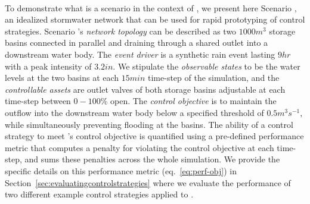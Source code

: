 \

To demonstrate what is a scenario in the context of \pystormsNOSPACE, we present here Scenario , an idealized stormwater network that can be used for rapid prototyping of control strategies. Scenario 's \emph{network topology} can be described as two $1000 \unit{m^3}$ storage basins connected in parallel and draining through a shared outlet into a downstream water body. The \emph{event driver} is a synthetic rain event lasting $9 \unit{hr}$ with a peak intensity of $3.2 \unit{in}$. We stipulate the \emph{observable states} to be the water levels at the two basins at each $15 \unit{min}$ time-step of the simulation, and the \emph{controllable assets} are outlet valves of both storage basins adjustable at each time-step between $0-100\unit{\%}$ open. The \emph{control objective} is to maintain the outflow into the downstream water body below a specified threshold of $0.5 \unit{m^3s^{-1}}$, while simultaneously preventing flooding at the basins. The ability of a control strategy to meet 's control objective is quantified using a pre-defined performance metric that computes a penalty for violating the control objective at each time-step, and sums these penalties across the whole simulation. We provide the specific details on this performance metric (eq.~\ref{eq:perf-obj}) in Section~\ref{sec:evaluatingcontrolstrategies} where we evaluate the performance of two different example control strategies applied to .
%
%
%
